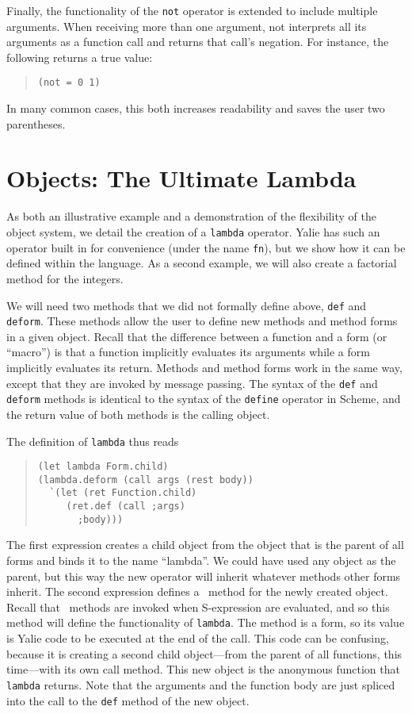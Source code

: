 \documentclass[twocolumn]{article}
\begin{document}
Finally, the functionality of the \texttt{not} operator is extended to
include multiple arguments. When receiving more than one argument, not
interprets all its arguments as a function call and returns that
call's negation. For instance, the following returns a true value:
\begin{quote}
\begin{verbatim}
(not = 0 1)
\end{verbatim}
\end{quote}
In many common cases, this both increases readability and saves the
user two parentheses.

\section*{Objects: The Ultimate Lambda}
As both an illustrative example and a demonstration of the flexibility
of the object system, we detail the creation of a \texttt{lambda}
operator. Yalie has such an operator built in for convenience (under
the name \texttt{fn}), but we show how it can be defined within the
language. As a second example, we will also create a factorial method
for the integers.

We will need two methods that we did not formally define above,
\texttt{def} and \texttt{deform}. These methods allow the user to
define new methods and method forms in a given object. Recall that the
difference between a function and a form (or ``macro'') is that a
function implicitly evaluates its arguments while a form implicitly
evaluates its return. Methods and method forms work in the same way,
except that they are invoked by message passing. The syntax of the
\texttt{def} and \texttt{deform} methods is identical to the syntax of
the \texttt{define} operator in Scheme, and the return value of both
methods is the calling object.

The definition of \texttt{lambda} thus reads
\begin{quote}
\begin{verbatim}
(let lambda Form.child)
(lambda.deform (call args (rest body))
  `(let (ret Function.child)
     (ret.def (call ;args)
       ;body)))
\end{verbatim}
\end{quote}
The first expression creates a child object from the object that is
the parent of all forms and binds it to the name ``lambda''. We could
have used any object as the parent, but this way the new operator will
inherit whatever methods other forms inherit. The second expression
defines a \call\ method for the newly created object. Recall that
\call\ methods are invoked when S-expression are evaluated, and so
this method will define the functionality of \texttt{lambda}. The
method is a form, so its value is Yalie code to be executed at the end
of the call. This code can be confusing, because it is creating a
second child object---from the parent of all functions, this
time---with its own call method. This new object is the anonymous
function that \texttt{lambda} returns. Note that the arguments and the
function body are just spliced into the call to the \texttt{def}
method of the new object.
\end{document}
